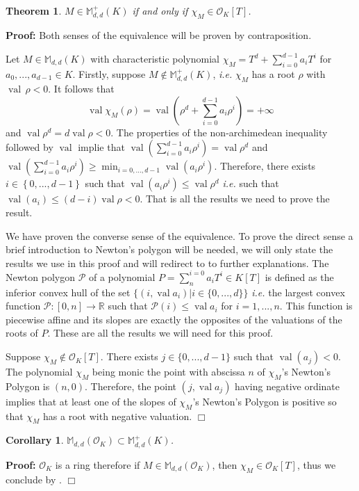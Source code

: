 \documentclass[a4paper,12pt]{article}
\newenvironment{proof}{\hbox{}\vspace{-0.8cm} {\bf Proof:}}{\hfill $\Box$}
\newtheorem{theorem}{Theorem}[section]
\newtheorem{corollary}{Corollary}
\newcommand{\R}{\mathbb{R}} %
\newcommand{\allmat}{\mathbb{M}} %
\DeclareMathOperator{\val}{val}
\newcommand{\OK}{\mathcal{O}_K}
\begin{document}
\begin{theorem}
  \label{caracsdp}
  $M \in \allmat_{d,d}^+(K)$ if and only if $\chi_M \in \OK[T]$.
\end{theorem}
\begin{proof}
  Both senses of the equivalence will be proven by contraposition.

  Let $M \in \allmat_{d,d}(K)$ with characteristic polynomial $\chi_M = T^d + \sum_{i=0}^{d-1} a_i T^i$ for $a_0,...,a_{d-1} \in K$.
  Firstly, suppose $M \not \in \allmat_{d,d}^+(K)$, {\it i.e.} $\chi_M$ has a root $\rho$ with $\val\,\rho<0$.
  It follows that
  $$
  \val \chi_M (\rho) = \val \left(\rho^d+ \sum_{i=0}^{d-1} a_i \rho^i\right) = + \infty
  $$ and $\val \rho^d = d \val \rho <0$.
  The properties of the non-archimedean inequality followed by $\val $ implie that $\val ( \sum_{i=0}^{d-1} a_i \rho^i) = \val \rho^d$ and $\val ( \sum_{i=0}^{d-1} a_i \rho^i) \ge \min_{i=0,..., d-1} \val \left(a_i \rho^i\right)$. Therefore, there exists $i \in \left\{0,...,d-1\right\}$ such that $\val( a_i \rho^i) \le \val\rho^d$ {\it i.e.} such that $\val (a_i) \le (d-i) \val \rho <0$. That is all the results we need to prove the result.
  
  We have proven the converse sense of the equivalence. To prove the direct sense a brief introduction to Newton's polygon will be needed, we will only state the results we use in this proof and will redirect to \cite{gouvea_p-adic_2003} to further explanations.
  The Newton polygon $\mathcal{P}$ of a polynomial $P = \sum_{n}^{i=0} a_i T^i \in K[T]$ is defined as the inferior convex hull of the set $\{(i, \val a_i ) | i\in \{0,...,d\} \}$ {\it i.e.} the largest convex function $\mathcal{P} : [0,n] \to \R$ such that $\mathcal{P}(i) \leq \val a_i$ for $i=1,...,n$. 
  This function is piecewise affine and its slopes are exactly the opposites of the valuations of the roots of $P$. These are all the results we will need for this proof.

  Suppose $\chi_M \not\in \OK[T]$. There exists $j \in \{0,...,d-1\}$ such that $\val (a_j)<0$. The polynomial $\chi_M$ being monic the point with abscissa $n$ of $\chi_M$'s Newton's Polygon is $(n,0)$. 
  Therefore, the point $(j, \val a_j)$ having negative ordinate implies that at least one of the slopes of $\chi_M$'s Newton's Polygon is positive so that $\chi_M$ has a root with negative valuation.
\end{proof}

\begin{corollary}\label{cor_caracsdp}
  $\allmat_{d,d}(\OK) \subset \allmat_{d,d}^+(K)$.
\end{corollary}
\begin{proof}
  $\OK$ is a ring therefore if $M \in \allmat_{d,d}(\OK)$, then $\chi_M \in \OK[T]$, thus we conclude
  by .
\end{proof}
\end{document}
